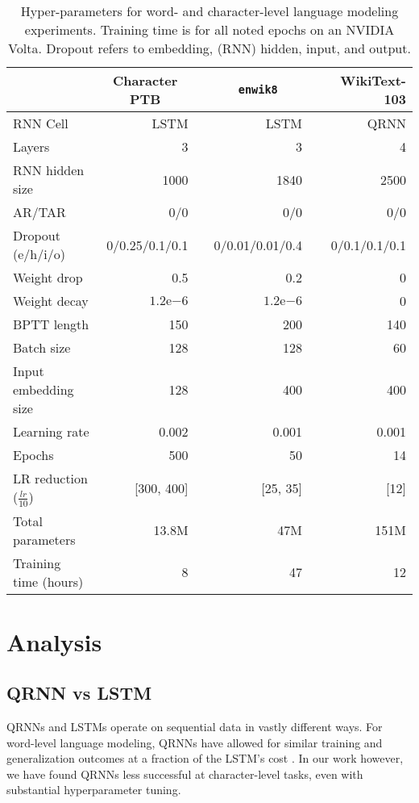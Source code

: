 \documentclass{article}
\newcommand{\enwik}{\texttt{enwik8}\xspace}
\begin{document}
\begin{table*}
\renewcommand{\arraystretch}{1.1}
\begin{center}
 \begin{tabular}{@{} lrrrrr @{}} 
 \toprule[1.5pt]
  &  \multicolumn{1}{c}{Character PTB} &  & \multicolumn{1}{c}{\enwik} & & WikiText-103 \\ 
\midrule
 RNN Cell  & \small{LSTM} & & \small{LSTM} & & \small{QRNN}\\ 
 Layers & 3 & & 3 & & 4 \\
 RNN hidden size & 1000 & & 1840 & & 2500 \\
 AR/TAR & 0/0 & & 0/0 & & 0/0 \\
 Dropout (e/h/i/o) & 0/0.25/0.1/0.1 & & 0/0.01/0.01/0.4 & & 0/0.1/0.1/0.1 \\
 Weight drop & 0.5 & & 0.2 & & 0 \\
 \midrule
 Weight decay & $1.2\mathrm{e}{-6}$ & & $1.2\mathrm{e}{-6}$ & & 0 \\
 BPTT length & 150 & & 200 & & 140 \\
 Batch size & 128 & & 128 & & 60 \\
 Input embedding size & 128 & & 400 & & 400 \\
 Learning rate & 0.002 & & 0.001 & & 0.001 \\
 Epochs & 500 & & 50 & & 14 \\
 LR reduction ($\frac{lr}{10}$) & [300, 400] & & [25, 35] & & [12] \\
 \midrule
 Total parameters & 13.8M & & 47M & & 151M \\
 Training time (hours) & 8 & & 47 & & 12 \\
 \bottomrule[1.5pt]
\end{tabular}
\caption{
Hyper-parameters for word- and character-level language modeling experiments.
Training time is for all noted epochs on an NVIDIA Volta.
Dropout refers to embedding, (RNN) hidden, input, and output. \label{table:fullhypers}}
\end{center}
\end{table*}

\section{Analysis}

\subsection{QRNN vs LSTM}
QRNNs and LSTMs operate on sequential data in vastly different ways.
For word-level language modeling, QRNNs have allowed for similar training and generalization outcomes at a fraction of the LSTM's cost \citep{merity2018regularizing}.
In our work however, we have found QRNNs less successful at character-level tasks, even with substantial hyperparameter tuning.
\end{document}
